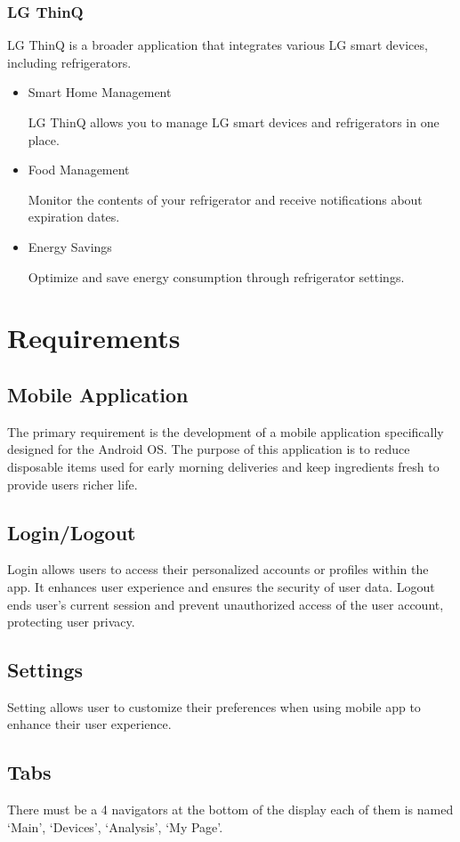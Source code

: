 \documentclass[conference]{IEEEtran}
\begin{document}
\subsubsection{LG ThinQ}
    LG ThinQ is a broader application that integrates various LG smart devices, including refrigerators.
\begin{itemize}
    \item Smart Home Management\par
    LG ThinQ allows you to manage LG smart devices and refrigerators in one place.
    \item Food Management\par
    Monitor the contents of your refrigerator and receive notifications about expiration dates.
    \item Energy Savings\par
    Optimize and save energy consumption through refrigerator settings.
    
\end{itemize}


\section{Requirements}

\subsection{Mobile Application}
The primary requirement is the development of a mobile application specifically designed for the Android OS. The purpose of this application is to reduce disposable items used for early morning deliveries and keep ingredients fresh to provide users richer life.

\subsection{Login/Logout}
Login allows users to access their personalized accounts or profiles within the app. It enhances user experience and ensures the security of user data. Logout ends user’s current session and prevent unauthorized access of the user account, protecting user privacy.
\subsection{Settings}
Setting allows user to customize their preferences when using mobile app to enhance their user experience.
\subsection{Tabs}
There must be a 4 navigators at the bottom of the display each of them is named ‘Main’, ‘Devices’, ‘Analysis’, ‘My Page’.
\end{document}
